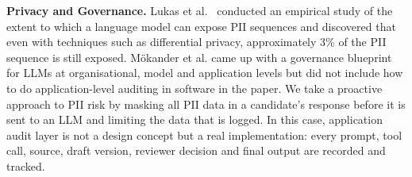 \vspace{10pt}
\noindent\textbf{Privacy and Governance.}
Lukas et al.\ \cite{lukas} conducted an empirical study of the extent to which a language model can expose PII sequences and discovered that even with techniques such as differential privacy, approximately 3\% of the PII sequence is still exposed. M\"{o}kander et al. \cite{mokander} came up with a governance blueprint for LLMs at organisational, model and application levels but did not include how to do application-level auditing in software in the paper. We take a proactive approach to PII risk by masking all PII data in a candidate's response before it is sent to an LLM and limiting the data that is logged. In this case, application audit layer is not a design concept but a real implementation: every prompt, tool call, source, draft version, reviewer decision and final output are recorded and tracked.

